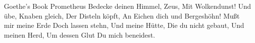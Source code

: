 {Goethe's Book}
{Prometheus}
{Bedecke deinen Himmel, Zeus,
 Mit Wolkendunst!
 Und \"ube, Knaben gleich,
 Der Disteln k\"opft,
 An Eichen dich und Bergesh\"ohn!
 Mußt mir meine Erde
 Doch lassen stehn,
 Und meine H\"utte,
 Die du nicht gebaut,
 Und meinen Herd,
 Um dessen Glut
 Du mich beneidest.
}
